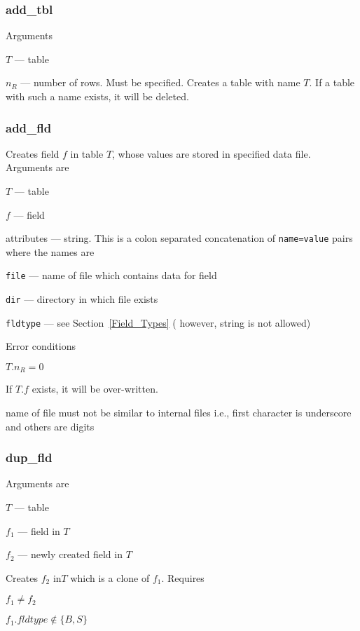 \documentclass{report}
\begin{document}
\subsubsection{add\_tbl}
\label{add_tbl}
Arguments 
\be
\item \(T\) --- table
\item \(n_R\) --- number of rows. Must be specified.
\ee
Creates a table with name \(T\). If a table with such a name exists, it
will be deleted.


\subsubsection{add\_fld}
\label{add_fld}

Creates field \(f\) in table \(T\), whose values are stored in specified
data file.  Arguments are 
\be
\item \(T\) --- table
\item \(f\) --- field
\item attributes --- string. This is a colon separated concatenation of
\verb+name=value+ pairs where the names are
\be
\item \verb+file+ --- name of file which contains data for field 
\item \verb+dir+ --- directory in which file exists
\item \verb+fldtype+ --- see Section~\ref{Field_Types} ( however, string
    is not allowed)
\ee
\ee

Error conditions
\be
\item \(T.n_R = 0 \)
\item If \(T.f\) exists, it will be over-written.
\item name of file must not be similar to internal files i.e., first
character is underscore and others are digits
\ee


\subsubsection{dup\_fld}
\label{dup_fld}
Arguments are 
\be
\item \(T\) --- table
\item \(f_1\) --- field in \(T\)
\item \(f_2\) --- newly created field in \(T\)
\ee

Creates \(f_2\) in\(T\) which is a clone of \(f_1\). Requires
\be
\item \(f_1 \neq f_2\)
\item \(f_1.fldtype \not \in \{B, S\}\)
\ee
\end{document}
